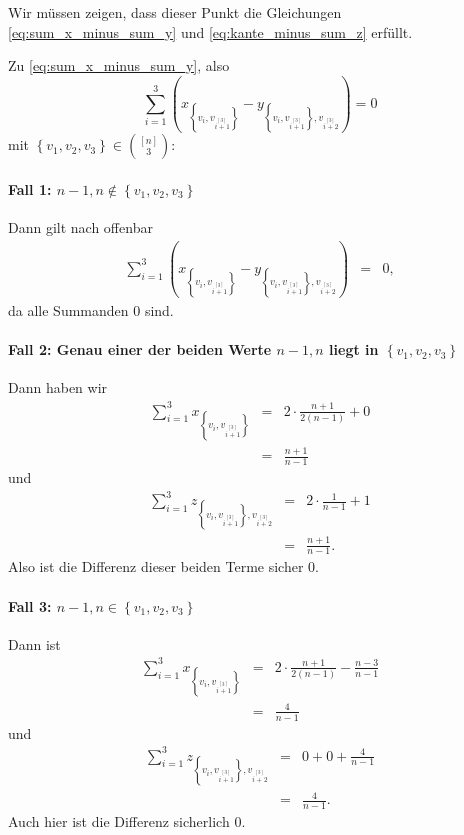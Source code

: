 \documentclass[10p,a4paper,BCOR = 12mm, DIV=15]{scrbook}
\begin{document}
{\begin{bew}
Wir müssen zeigen, dass dieser Punkt die Gleichungen \eqref{eq:sum_x_minus_sum_y} und \eqref{eq:kante_minus_sum_z} erfüllt.

Zu \eqref{eq:sum_x_minus_sum_y}, also
\begin{displaymath}
\sum_{i=1}^3 \left(x_{\left\{v_{i}, v_{i \stackrel{\left[3\right]}{+} 1}\right\}} - y_{\left\{v_{i}, v_{i \stackrel{\left[3\right]}{+} 1}\right\}, v_{i \stackrel{\left[3\right]}{+} 2}}\right) = 0
\end{displaymath}
mit $\left\{v_1, v_2, v_3\right\} \in {\left[n\right] \choose 3}$:

\paragraph{Fall 1: $n-1, n\notin \left\{v_1, v_2, v_3\right\}$} Dann gilt nach offenbar
\begin{eqnarray*}
\sum_{i=1}^3 \left(x_{\left\{v_{i}, v_{i \stackrel{\left[3\right]}{+} 1}\right\}} -  y_{\left\{v_{i}, v_{i \stackrel{\left[3\right]}{+} 1}\right\}, v_{i \stackrel{\left[3\right]}{+} 2}}\right) & = & 0,
\end{eqnarray*}
da alle Summanden $0$ sind.

\paragraph{Fall 2: Genau einer der beiden Werte $n-1, n$ liegt in $\left\{v_1, v_2, v_3\right\}$} Dann haben wir 
\begin{eqnarray*}
\sum_{i=1}^3 x_{\left\{v_{i}, v_{i \stackrel{\left[3\right]}{+} 1}\right\}} & = & 2 \cdot \frac{n+1}{2\left(n-1\right)} + 0 \\
& = & \frac{n+1}{n-1}
\end{eqnarray*}
und
\begin{eqnarray*}
\sum_{i=1}^3 z_{
\left\{
v_{i}, 
v_{i \stackrel{\left[3\right]}{+} 1}
\right\}, 
v_{i \stackrel{\left[3\right]}{+} 2}} & = & 2\cdot \frac{1}{n-1} + 1 \\
& = & \frac{n+1}{n-1}.
\end{eqnarray*}
Also ist die Differenz dieser beiden Terme sicher 0.

\paragraph{Fall 3: $n-1, n\in \left\{v_1, v_2, v_3\right\}$} Dann ist 
\begin{eqnarray*}
\sum_{i=1}^3 x_{\left\{v_{i}, v_{i \stackrel{\left[3\right]}{+} 1}\right\}} & = & 2 \cdot \frac{n+1}{2\left(n-1\right)} - \frac{n-3}{n-1} \\
& = & \frac{4}{n-1}
\end{eqnarray*}
und
\begin{eqnarray*}
\sum_{i=1}^3 z_{
\left\{
v_{i}, 
v_{i \stackrel{\left[3\right]}{+} 1}
\right\}, 
v_{i \stackrel{\left[3\right]}{+} 2}} & = & 0 + 0 + \frac{4}{n-1} \\
& = & \frac{4}{n-1}.
\end{eqnarray*}
Auch hier ist die Differenz sicherlich 0.
\\


\end{bew}}
\end{document}

